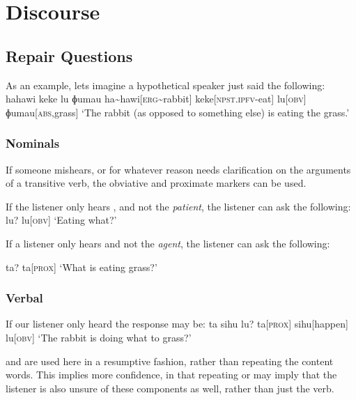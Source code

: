 
\chapter{Discourse}

\section{Repair Questions}
As an example, lets imagine a hypothetical speaker just said the following:
\ex
\begingl
\glpreamble hahawi keke lu ɸumau
\endpreamble
ha\textasciitilde hawi[\textsc{erg\textasciitilde}rabbit]
keke[\textsc{npst.ipfv-}eat]
lu[\textsc{obv}]
ɸumau[\textsc{abs,}grass]
\glft `The rabbit (as opposed to something else) is eating the grass.'
\endgl
\xe

\subsection{Nominals}

If someone mishears, or for whatever reason needs clarification on the arguments of a transitive verb, the obviative and proximate markers can be used.

\begin{paracol}{2}
If the listener only hears , and not the \textit{patient}, the listener can ask the following:
\ex
\begingl
\glpreamble lu?
\endpreamble
lu[\textsc{obv}]
\glft `Eating what?'
\endgl
\xe
\switchcolumn

If a listener only hears  and not the \textit{agent}, the listener can ask the following:

\ex
\begingl
\glpreamble ta?
\endpreamble
ta[\textsc{prox}]
\glft `What is eating grass?'
\endgl
\xe
\end{paracol}

\subsection{Verbal}
If our listener only heard  the response may be:
\ex
\begingl
\glpreamble ta sihu lu?
\endpreamble
ta[\textsc{prox}]
sihu[happen]
lu[\textsc{obv}]
\glft `The rabbit is doing what to grass?'
\endgl
\xe

 and  are used here in a resumptive fashion, rather than repeating the content words.
This implies more confidence, in that repeating  or  may imply that the listener is also unsure of these components as well, rather than just the verb.

